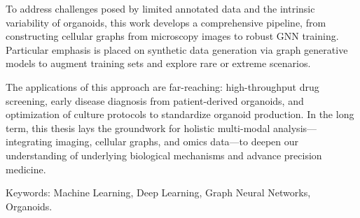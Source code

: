 To address challenges posed by limited annotated data and the intrinsic variability of organoids, this work develops a comprehensive pipeline, from constructing cellular graphs from microscopy images to robust GNN training. Particular emphasis is placed on synthetic data generation via graph generative models to augment training sets and explore rare or extreme scenarios.

The applications of this approach are far-reaching: high-throughput drug screening, early disease diagnosis from patient-derived organoids, and optimization of culture protocols to standardize organoid production. In the long term, this thesis lays the groundwork for holistic multi-modal analysis—integrating imaging, cellular graphs, and omics data—to deepen our understanding of underlying biological mechanisms and advance precision medicine.

\vspace{0.5cm}
Keywords: Machine Learning, Deep Learning, Graph Neural Networks, Organoids.
